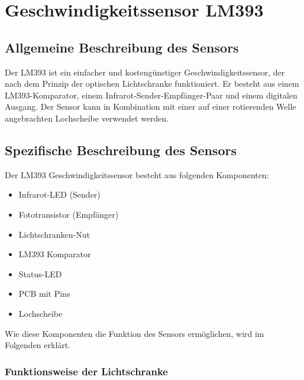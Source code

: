 %
%

\chapter{Geschwindigkeitssensor LM393}


\section{Allgemeine Beschreibung des Sensors}

Der LM393 ist ein einfacher und kostengünstiger Geschwindigkeitssensor, der nach dem Prinzip der optischen Lichtschranke funktioniert. Er besteht aus einem LM393-Komparator, einem Infrarot-Sender-Empfänger-Paar und einem digitalen Ausgang. Der Sensor kann in Kombination mit einer auf einer rotierenden Welle angebrachten Lochscheibe verwendet werden.

\section{Spezifische Beschreibung des Sensors}

Der LM393 Geschwindigkeitssensor besteht aus folgenden Komponenten:

\begin{itemize}
	\item Infrarot-LED (Sender)
	\item Fototransistor (Empfänger)
	\item Lichtschranken-Nut
	\item LM393 Komparator
	\item Status-LED
	\item PCB mit Pins
	\item Lochscheibe
\end{itemize}

Wie diese Komponenten die Funktion des Sensors ermöglichen, wird im Folgenden erklärt.

\subsection{Funktionsweise der Lichtschranke}

